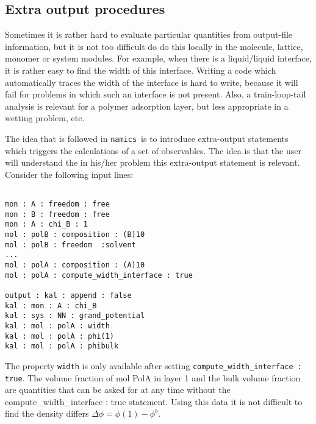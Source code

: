 \documentclass{article}
\newcommand{\namics}{{\tt namics}}
\begin{document}
\subsection{Extra output procedures}
\label{sec:extras}
Sometimes it is rather hard to evaluate particular quantities from output-file information, but it is not too difficult do do this locally in the molecule, lattice, monomer or system modules. For example, when there is a liquid/liquid interface, it is rather easy to find the width of this interface. Writing a code which automatically traces the width of the interface is hard to write, because it will fail for problems in which such an interface is not present. Also, a train-loop-tail analysis is relevant for a polymer adsorption layer, but less appropriate in a wetting problem, etc. 

The idea that is followed in \namics\ is to introduce extra-output statements which triggers the calculations of a set of observables. The idea is that the user will understand the in his/her problem this extra-output statement is relevant. Consider the following input lines:

\begin{verbatim} 

mon : A : freedom : free
mon : B : freedom : free
mon : A : chi_B : 1
mol : polB : composition : (B)10
mol : polB : freedom  :solvent
...
mol : polA : composition : (A)10
mol : polA : compute_width_interface : true

output : kal : append : false
kal : mon : A : chi_B
kal : sys : NN : grand_potential
kal : mol : polA : width 
kal : mol : polA : phi(1)
kal : mol : polA : phibulk
\end{verbatim}

The property {\tt width} is only available after setting {\tt compute\_width\_interface : true}. The volume fraction of mol PolA in layer 1 and the bulk volume fraction are quantities that can be asked for at any time without the {compute\_width\_interface : true} statement. Using this data it is not difficult to find the density differs $\Delta \phi=\phi(1)-\phi^b$. 
\end{document}
